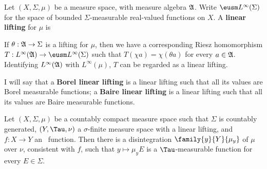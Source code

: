 
 Let $(X,\Sigma,\mu)$ be a measure space,
with measure algebra $\frak A$.   Write
$\eusm L^{\infty}(\Sigma)$ for the space of bounded $\Sigma$-measurable
real-valued functions on $X$.  A {\bf linear lifting} for $\mu$ is



If $\theta:\frak A\to\Sigma$ is a lifting for $\mu$, then we have a
corresponding Riesz homomorphism
$T:L^{\infty}(\frak A)\to\eusm L^{\infty}(\Sigma)$ such that
$T(\chi a)=\chi(\theta a)$ for every $a\in\frak A$.
Identifying $L^{\infty}(\frak A)$ with $L^{\infty}(\mu)$,  $T$ can be regarded as a linear lifting.   

 I will say that a {\bf Borel linear lifting} is a
linear lifting such that all its values are Borel measurable functions;
a {\bf Baire linear lifting} is a linear lifting such that all its
values are Baire measurable functions.

 Let $(X,\Sigma,\mu)$ be a countably compact
measure space such that $\Sigma$ is countably generated, $(Y,\Tau,\nu)$
a $\sigma$-finite measure space with a linear lifting, and
$f:X\to Y$ an \imp\ function.   Then there is a disintegration
$\family{y}{Y}{\mu_y}$ of $\mu$ over $\nu$, consistent with $f$, such
that $y\mapsto\mu_yE$ is a $\Tau$-measurable function for every
$E\in\Sigma$.

